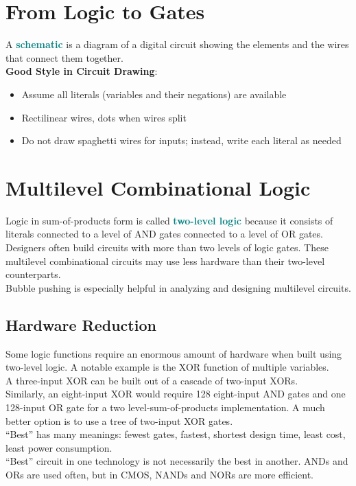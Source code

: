 \documentclass[12pt]{article}
\theoremstyle{definition}
\newcommand{\defnterm}[1]{\textbf{\textcolor{teal}{#1}}\index{#1}}
\begin{document}
  \newpage
  \section{From Logic to Gates}
  A \defnterm{schematic} is a diagram of a digital circuit showing the elements and the wires that connect them together. \\

  \textbf{Good Style in Circuit Drawing}:
  \begin{itemize}
    \item Assume all literals (variables and their negations) are available
    \item Rectilinear wires, dots when wires split
    \item Do not draw spaghetti wires for inputs; instead, write each literal as needed
  \end{itemize}

  \section{Multilevel Combinational Logic}
  Logic in sum-of-products form is called \defnterm{two-level logic} because it consists of literals connected to a level of AND gates connected to a level of OR gates. \\
  Designers often build circuits with more than two levels of logic gates.
  These multilevel combinational circuits may use less hardware than their two-level counterparts. \\
  Bubble pushing is especially helpful in analyzing and designing multilevel circuits.

  \subsection{Hardware Reduction}
  Some logic functions require an enormous amount of hardware when built using two-level logic.
  A notable example is the XOR function of multiple variables. \\
  A three-input XOR can be built out of a cascade of two-input XORs. \\
  Similarly, an eight-input XOR would require 128 eight-input AND gates and one 128-input OR gate for a two level-sum-of-products implementation. A much better option is to use a tree of two-input XOR gates. \\

  ``Best'' has many meanings: fewest gates, fastest, shortest design time, least cost, least power consumption. \\
  ``Best'' circuit in one technology is not necessarily the best in another.
  ANDs and ORs are used often, but in CMOS, NANDs and NORs are more efficient.
\end{document}
